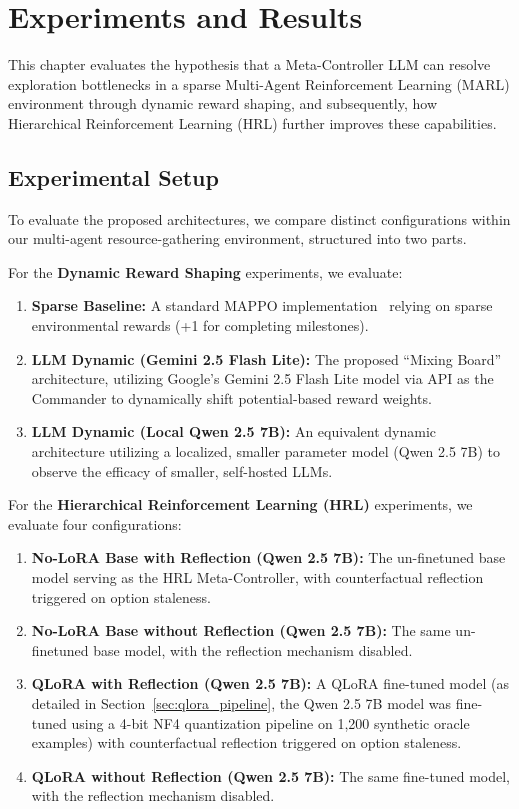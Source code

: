 \section{Experiments and Results}
\label{ch:experiments}

This chapter evaluates the hypothesis that a Meta-Controller LLM can resolve exploration bottlenecks in a sparse Multi-Agent Reinforcement Learning (MARL) environment through dynamic reward shaping, and subsequently, how Hierarchical Reinforcement Learning (HRL) further improves these capabilities.

\subsection{Experimental Setup}
\label{sec:exp_setup}

To evaluate the proposed architectures, we compare distinct configurations within our multi-agent resource-gathering environment, structured into two parts. 

For the \textbf{Dynamic Reward Shaping} experiments, we evaluate:
\begin{enumerate}
    \item \textbf{Sparse Baseline:} A standard MAPPO implementation~\parencite{Yu_Velu_Vinitsky_Gao_Wang_Bayen_Wu_2022} relying on sparse environmental rewards (+1 for completing milestones).
    \item \textbf{LLM Dynamic (Gemini 2.5 Flash Lite):} The proposed ``Mixing Board'' architecture, utilizing Google's Gemini 2.5 Flash Lite model via API as the Commander to dynamically shift potential-based reward weights. 
    \item \textbf{LLM Dynamic (Local Qwen 2.5 7B):} An equivalent dynamic architecture utilizing a localized, smaller parameter model (Qwen 2.5 7B) to observe the efficacy of smaller, self-hosted LLMs. 
\end{enumerate}

For the \textbf{Hierarchical Reinforcement Learning (HRL)} experiments, we evaluate four configurations:
\begin{enumerate}
    \item \textbf{No-LoRA Base with Reflection (Qwen 2.5 7B):} The un-finetuned base model serving as the HRL Meta-Controller, with counterfactual reflection triggered on option staleness.
    \item \textbf{No-LoRA Base without Reflection (Qwen 2.5 7B):} The same un-finetuned base model, with the reflection mechanism disabled.
    \item \textbf{QLoRA with Reflection (Qwen 2.5 7B):} A QLoRA fine-tuned model (as detailed in Section~\ref{sec:qlora_pipeline}, the Qwen 2.5 7B model was fine-tuned using a 4-bit NF4 quantization pipeline on 1,200 synthetic oracle examples) with counterfactual reflection triggered on option staleness.
    \item \textbf{QLoRA without Reflection (Qwen 2.5 7B):} The same fine-tuned model, with the reflection mechanism disabled.
\end{enumerate}

